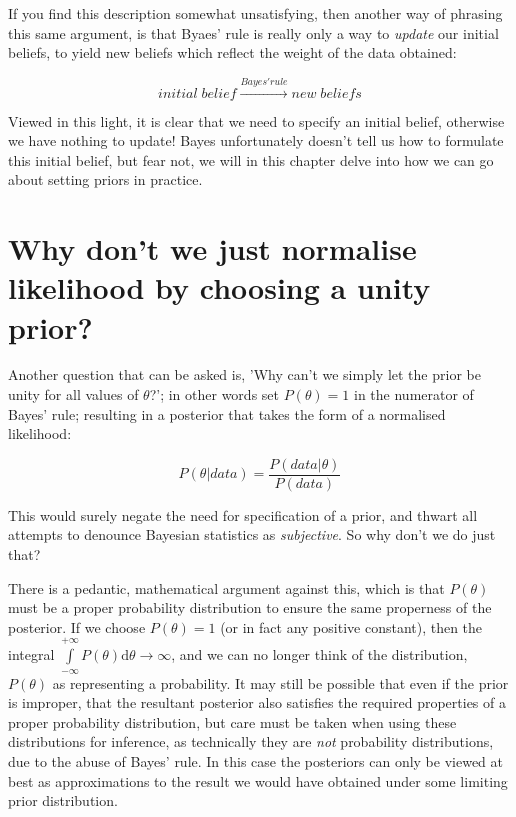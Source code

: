 \documentclass[11pt,fullpage]{book}
\begin{document}
If you find this description somewhat unsatisfying, then another way of phrasing this same argument, is that Byaes' rule is really only a way to \textit{update} our initial beliefs, to yield new beliefs which reflect the weight of the data obtained:

\begin{equation}
initial\; belief \xrightarrow{Bayes' rule} new\;beliefs
\end{equation}

Viewed in this light, it is clear that we need to specify an initial belief, otherwise we have nothing to update! Bayes unfortunately doesn't tell us how to formulate this initial belief, but fear not, we will in this chapter delve into how we can go about setting priors in practice.

\section{Why don't we just normalise likelihood by choosing a unity prior?}\label{sec:Prior_unityPrior}
Another question that can be asked is, 'Why can't we simply let the prior be unity for all values of $\theta$?'; in other words set $P(\theta) = 1$ in the numerator of Bayes' rule; resulting in a posterior that takes the form of a normalised likelihood:

\begin{equation}
P(\theta|data) = \frac{P(data|\theta)} {P(data)}
\end{equation}\label{eq:Prior_BayesNormalisedLikelihood}


This would surely negate the need for specification of a prior, and thwart all attempts to denounce Bayesian statistics as \textit{subjective}. So why don't we do just that? 

There is a pedantic, mathematical argument against this, which is that $P(\theta)$ must be a proper probability distribution to ensure the same properness of the posterior. If we choose $P(\theta) = 1$ (or in fact any positive constant), then the integral $\int\limits_{-\infty}^{+\infty}P(\theta)\mathrm{d}\theta\rightarrow\infty$, and we can no longer think of the distribution, $P(\theta)$ as representing a probability. It may still be possible that even if the prior is improper, that the resultant posterior also satisfies the required properties of a proper probability distribution, but care must be taken when using these distributions for inference, as technically they are \textit{not} probability distributions, due to the abuse of Bayes' rule. In this case the posteriors can only be viewed at best as approximations to the result we would have obtained under some limiting prior distribution.
\end{document}
